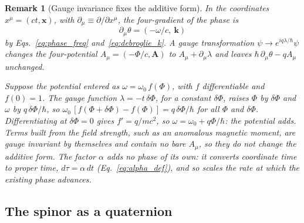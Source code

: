\documentclass[aps,prd,onecolumn,tightenlines,nofootinbib,notitlepage,11pt,floatfix]{revtex4-2}
\theoremstyle{indentedtheorem}
\newtheorem{remark}{Remark}
\begin{document}
\begin{remark}[Gauge invariance fixes the additive form]\label{rem:additivity}
In the coordinates $x^\mu=(ct,\mathbf{x})$, with $\partial_\mu\equiv\partial/\partial x^\mu$, the four-gradient of the phase is
\begin{equation}
    \partial_\mu\theta = (-\omega/c,\ \mathbf{k})
    \label{eq:phase_fourvector}
\end{equation}
by Eqs.~\eqref{eq:phase_freq} and~\eqref{eq:debroglie_k}. A gauge transformation $\psi\to e^{iq\lambda/\hbar}\psi$ changes the four-potential $A_\mu=(-\Phi/c,\mathbf{A})$ to $A_\mu+\partial_\mu\lambda$ and leaves $\hbar\,\partial_\mu\theta-qA_\mu$ unchanged.

Suppose the potential entered as $\omega=\omega_0\,f(\Phi)$, with $f$ differentiable and $f(0)=1$. The gauge function $\lambda=-t\,\delta\Phi$, for a constant $\delta\Phi$, raises $\Phi$ by $\delta\Phi$ and $\omega$ by $q\,\delta\Phi/\hbar$, so $\omega_0\,[f(\Phi+\delta\Phi)-f(\Phi)]=q\,\delta\Phi/\hbar$ for all $\Phi$ and $\delta\Phi$. Differentiating at $\delta\Phi=0$ gives $f'=q/mc^2$, so $\omega=\omega_0+q\Phi/\hbar$: the potential adds. Terms built from the field strength, such as an anomalous magnetic moment, are gauge invariant by themselves and contain no bare $A_\mu$, so they do not change the additive form. The factor $\alpha$ adds no phase of its own: it converts coordinate time to proper time, $d\tau=\alpha\,dt$ (Eq.~\eqref{eq:alpha_def}), and so scales the rate at which the existing phase advances.
\end{remark}

\subsection{The spinor as a quaternion}
\label{sec:spinor}
\end{document}
